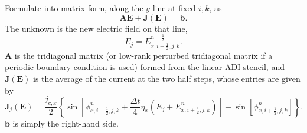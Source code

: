 \documentclass{article}
\numberwithin{equation}{section}
\numberwithin{figure}{section}
\begin{document}
Formulate into matrix form, along the \(y\)-line at fixed \(i,k\), as
\begin{equation}\label{eq:josephson-matrix}
    \mathbf{A}\mathbf{E}+\mathbf{J}(\mathbf{E})=\mathbf{b}.
\end{equation}
The unknown is the new electric field on that line,
\begin{equation}\label{eq:josephson-unknown}
    E_j=E_{x,i+\tfrac12,j,k}^{n+\frac12}.
\end{equation}
\(\mathbf{A}\) is the tridiagonal matrix (or low-rank perturbed tridiagonal matrix if a periodic boundary condition is used) formed from the linear ADI stencil, and \(\mathbf{J}(\mathbf{E})\) is the average of the current at the two half steps, whose entries are given by
\begin{equation}\label{eq:josephson-J-of-E}
    \mathbf{J}_j(\mathbf{E})=\frac{j_{c,x}}{2} \left\{\sin\!\left[\phi_{x,i+\tfrac12,j,k}^{n}+\frac{\Delta t}{4}\eta_x\left(E_j+E_{x,i+\tfrac12,j,k}^{n}\right)\right] + \sin\!\left[\phi_{x,i+\tfrac12,j,k}^{n}\right]\right\}.
\end{equation}
$\mathbf{b}$ is simply the right-hand side.
\end{document}

